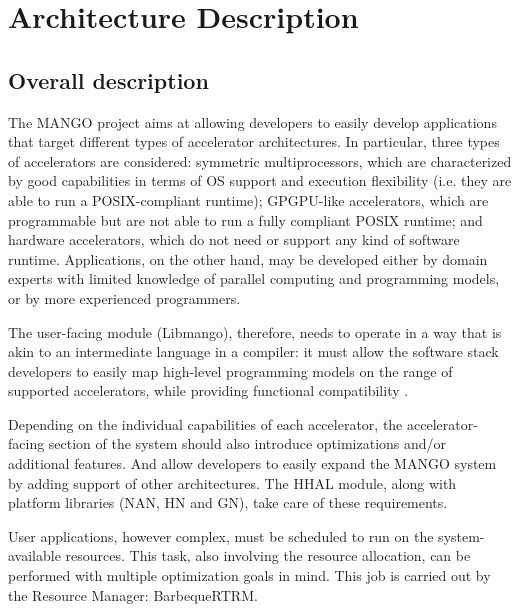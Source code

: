 \chapter{Architecture Description} \label{ch:ArchitectureDescription}

\section{Overall description}

The MANGO project aims at allowing developers to easily develop applications that target different types of accelerator architectures. In particular, three types of accelerators are considered: symmetric multiprocessors, which are characterized by good capabilities in terms of OS support and execution flexibility (i.e. they are able to run a POSIX-compliant runtime); GPGPU-like accelerators, which are programmable but are not able to run a fully compliant POSIX runtime; and hardware accelerators, which do not need or support any kind  of software runtime. Applications, on the other hand, may be developed either by domain experts with limited knowledge of parallel computing and programming models, or by more experienced programmers. 

The user-facing module (Libmango), therefore, needs to operate in a way that is akin to an intermediate language in a compiler: it must allow the software stack developers to easily map high-level programming models on the range of supported accelerators, while providing functional compatibility \cite{mango_exploring_manycore_architectures}. 

Depending on the individual capabilities of each accelerator, the accelerator-facing section of the system should also introduce optimizations and/or additional features. And allow developers to easily expand the MANGO system by adding support of other architectures. The HHAL module, along with platform libraries (NAN, HN and GN), take care of these requirements.

User applications, however complex, must be scheduled to run on the system-available resources. This task, also involving the resource allocation, can be performed with multiple optimization goals in mind. This job is carried out by the Resource Manager: BarbequeRTRM.

